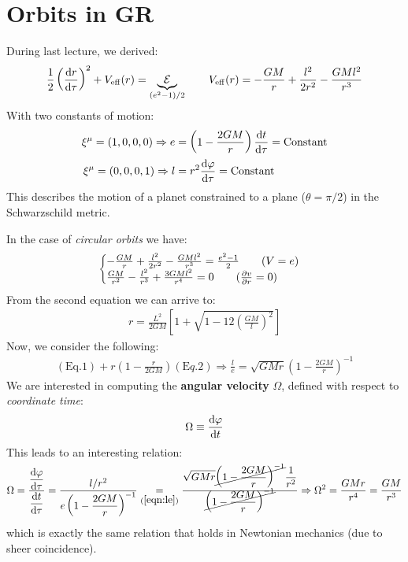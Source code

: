 \documentclass[../template.tex]{subfiles}
\begin{document}
\section{Orbits in GR}
During last lecture, we derived:
\begin{align*}
    \frac{1}{2}\left(\dv{r}{\tau}\right)^2 + V_{\mathrm{eff}}(r) = \underbrace{\mathcal{E}}_{(e^2-1)/2} \qquad V_{\mathrm{eff} }(r) = -\frac{GM}{r} + \frac{l^2}{2r^2} - \frac{GMl^2}{r^3}    
\end{align*}
With two constants of motion:
\begin{align*}
    \xi^\mu = (1,0,0,0) \Rightarrow e &= \left(1-\frac{2GM}{r} \right) \dv{t}{\tau} = \text{Constant}\\
    \xi^\mu = (0,0,0,1) \Rightarrow l &= r^2 \dv{\varphi}{\tau} = \text{Constant}
\end{align*}
This describes the motion of a planet constrained to a plane ($\theta = \pi/2$) in the Schwarzschild metric.

In the case of \textit{circular orbits} we have:
\begin{align*}
    \begin{cases}
        -\frac{GM}{r} + \frac{l^2}{2r^2} - \frac{GM l^2}{r^3} = \frac{e^2 -1}{2} \qquad (V = e)\\
        \frac{GM}{r^2} - \frac{l^2}{r^3} + \frac{3GM l^2}{r^4} = 0 \qquad (\pdv{v}{r} = 0)      
    \end{cases}
\end{align*}
From the second equation we can arrive to:
\begin{align*}
    r = \frac{L^2}{2 GM} \left[1+ \sqrt{1- 12 \left(\frac{GM}{l} \right)^2}\right] 
\end{align*} 
Now, we consider the following:
\begin{align}
    (\mathrm{Eq.1}) + r\left(1-\frac{r}{2GM} \right) (\mathrm
    Eq.2) \Rightarrow \frac{l}{e} = \sqrt{GM r} \left(1-\frac{2 GM}{r} \right)^{-1} \label{eqn:le}
\end{align}
We are interested in computing the \textbf{angular velocity} $\Omega$, defined with respect to \textit{coordinate time}:
\begin{align*}
    \Omega \equiv \dv{\varphi}{t}
\end{align*}   
This leads to an interesting relation:
\begin{align*}
    \Omega = \frac{\displaystyle \dv{\varphi}{\tau}}{\displaystyle \dv{t}{\tau}} = \frac{l/r^2}{\displaystyle e\left(1- \frac{2GM}{r} \right)^{-1}}  \underset{(\ref{eqn:le})}{=} \frac{\displaystyle \sqrt{GMr}\cancel{\left(1-\frac{2GM}{r} \right)^{-1}}\frac{1}{r^2} }{\displaystyle \cancel{\left(1-\frac{2GM}{r} \right)^{-1}}} \Rightarrow \Omega^2 = \frac{GM r}{r^4} = \frac{GM}{r^3}  
\end{align*}
which is exactly the same relation that holds in Newtonian mechanics (due to sheer coincidence).
\end{document}
